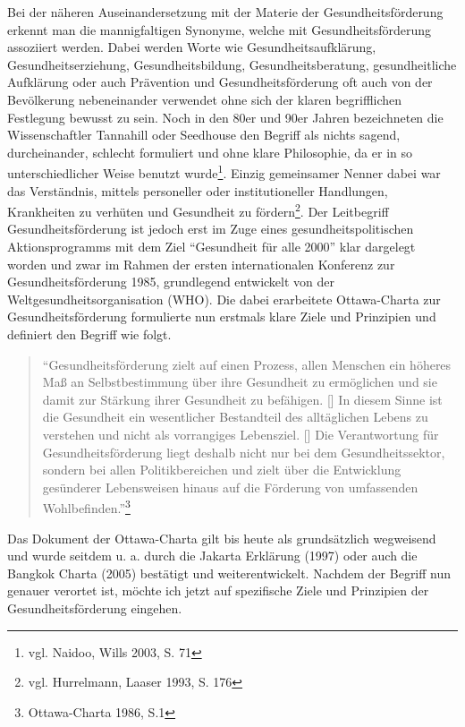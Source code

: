 Bei der näheren Auseinandersetzung mit der Materie der Gesundheitsförderung erkennt man die mannigfaltigen Synonyme, welche mit Gesundheitsförderung assoziiert werden. Dabei werden Worte wie Gesundheitsaufklärung, Gesundheitserziehung, Gesundheitsbildung, Gesundheitsberatung, gesundheitliche Aufklärung oder auch Prävention und Gesundheitsförderung oft auch von der Bevölkerung nebeneinander verwendet ohne sich der klaren begrifflichen Festlegung bewusst zu sein. Noch in den 80er und 90er Jahren bezeichneten die Wissenschaftler Tannahill oder Seedhouse den Begriff als nichts sagend, durcheinander, schlecht formuliert und ohne klare Philosophie, da er in so unterschiedlicher Weise benutzt wurde\footnote{vgl. Naidoo, Wills 2003, S. 71}. Einzig gemeinsamer Nenner dabei war das Verständnis, mittels personeller oder institutioneller Handlungen, Krankheiten zu verhüten und Gesundheit zu fördern\footnote{vgl. Hurrelmann, Laaser 1993, S. 176}. Der Leitbegriff Gesundheitsförderung ist jedoch erst im Zuge eines gesundheitspolitischen Aktionsprogramms mit dem Ziel "`Gesundheit für alle 2000"' klar dargelegt worden und zwar im Rahmen der ersten internationalen Konferenz zur Gesundheitsförderung 1985, grundlegend entwickelt von der Weltgesundheitsorganisation (WHO). Die dabei erarbeitete Ottawa-Charta zur Gesundheitsförderung formulierte nun erstmals klare Ziele und Prinzipien und definiert den Begriff wie folgt.

\begin{quotation}
"`Gesundheitsförderung zielt auf einen Prozess, allen Menschen ein höheres Maß an Selbstbestimmung über ihre Gesundheit zu ermöglichen und sie damit zur Stärkung ihrer Gesundheit zu befähigen. [\punkte] In diesem Sinne ist die Gesundheit ein wesentlicher Bestandteil des alltäglichen Lebens zu verstehen und nicht als vorrangiges Lebensziel. [\punkte] Die Verantwortung für Gesundheitsförderung liegt deshalb nicht nur bei dem Gesundheitssektor, sondern bei allen Politikbereichen und zielt über die Entwicklung gesünderer Lebensweisen hinaus auf die Förderung von umfassenden Wohlbefinden."'\footnote{Ottawa-Charta 1986, S.1}
\end{quotation}

Das Dokument der Ottawa-Charta gilt bis heute als grundsätzlich wegweisend und wurde seitdem u. a. durch die Jakarta Erklärung (1997) oder auch die Bangkok Charta (2005) bestätigt und weiterentwickelt.
Nachdem der Begriff nun genauer verortet ist, möchte ich jetzt auf spezifische Ziele und Prinzipien der Gesundheitsförderung eingehen.

